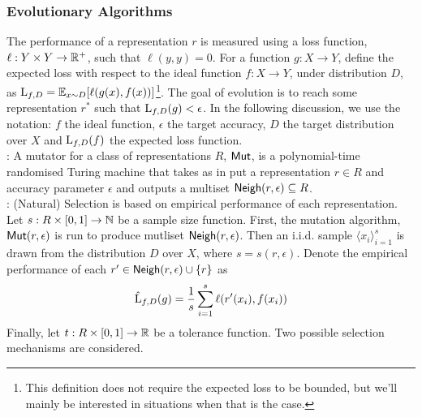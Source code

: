 \subsubsection*{Evolutionary Algorithms}

The performance of a representation $r$ is measured using a loss function, $\ell
: Y \times Y \rightarrow \mathbb{R}^+$, such that $\ell(y, y) = 0$. For a function
$g : X \rightarrow Y$, define the expected loss with respect to the ideal
function $f : X \rightarrow Y$, under distribution $D$, as $\mathrm{L}_{f, D} = \mathbb{E}_{x
\sim D}[\ell(g(x), f(x))]$\footnote{This definition does not require the
expected loss to be bounded, but we'll mainly be interested in situations when
that is the case.}. The goal of evolution is to reach some representation $r^*$
such that $\mathrm{L}_{f, D}(g) < \epsilon$. In the following discussion, we use the
notation: $f$ the ideal function, $\epsilon$ the target accuracy, $D$ the target
distribution over $X$ and $\mathrm{L}_{f, D}(f)$ the expected loss function. \medskip \\
%
: A mutator for a class of representations $R$, $\mathsf{Mut}$, is
a polynomial-time randomised Turing machine that takes as in put a
representation $r \in R$ and accuracy parameter $\epsilon$ and outputs a
multiset $\mathsf{Neigh}(r, \epsilon) \subseteq R$. \medskip \\
%
: (Natural) Selection is based on empirical performance
of each representation. Let $s : R \times [0, 1] \rightarrow \mathbb{N}$ be a
sample size function. First, the mutation algorithm, $\mathsf{Mut}(r, \epsilon)$ is run
to produce mutliset $\mathsf{Neigh}(r, \epsilon)$. Then an i.i.d. sample $\langle x_i
\rangle_{i=1}^s$ is drawn from the distribution $D$ over $X$, where $s = s(r,
\epsilon)$.  Denote the empirical performance of each $r^\prime \in \mathsf{Neigh}(r,
\epsilon) \cup \{r \}$ as
%
\[ \hat{\mathrm{L}}_{f, D}(g) = \frac{1}{s}\sum_{i=1}^s \ell(r^\prime(x_i), f(x_i)) \]
%
Finally, let $t : R \times [0, 1] \rightarrow \mathbb{R}$ be a tolerance function.
Two possible selection mechanisms are considered.
